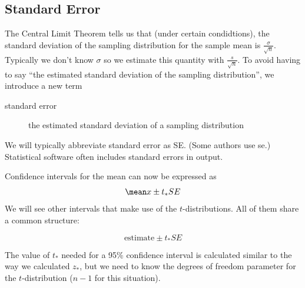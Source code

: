 \documentclass[twoside]{book}\usepackage[]{graphicx}\usepackage[]{xcolor}
\newlength{\tempfmlength}
\newenvironment{fmpage}[1]
     {
	 \medskip
	 \setlength{\tempfmlength}{#1}
	 \begin{lrbox}{\fmbox}
	   \begin{minipage}{#1}
		 \vspace*{.02\tempfmlength}
		 \hfill
	   \begin{minipage}{.95 \tempfmlength}}
		 {\end{minipage}\hfill
		 \vspace*{.015\tempfmlength}
		 \end{minipage}\end{lrbox}\fbox{\usebox{\fmbox}}
	 \medskip
	 }
\newenvironment{boxedText}[1][.98\textwidth]%
{%
\begin{center}
\begin{fmpage}{#1}
}%
{%
\end{fmpage}
\end{center}
}
\begin{document}
\subsection{Standard Error}

The Central Limit Theorem tells us that (under certain condidtions), the standard 
deviation of the sampling distribution for the sample mean is $\frac{\sigma}{\sqrt{n}}$.
Typically we don't know $\sigma$ so we estimate this quantity with 
$\frac{s}{\sqrt{n}}$.
To avoid having to say ``the estimated standard deviation of the sampling distribution'', 
we introduce a new term
\begin{description}
	\item[standard error] the estimated standard deviation of a sampling distribution
\end{description}

We will typically abbreviate standard error as SE. (Some authors use se.)
Statistical software often includes standard errors in output.

Confidence intervals for the mean can now be expressed as 
\[
\mean x \pm t_* SE
\]
We will see other intervals that make use of the $t$-distributions.  All of them
share a common structure:

\begin{boxedText}
		\[
		\mbox{estimate} \pm t_* SE
		\]
\end{boxedText}


The value of $t_*$ needed for a 95\% confidence interval is calculated
similar to the way we calculated $z_*$, but we need to know the degrees 
of freedom parameter for the $t$-distribution ($n-1$ for this situation).
\end{document}
